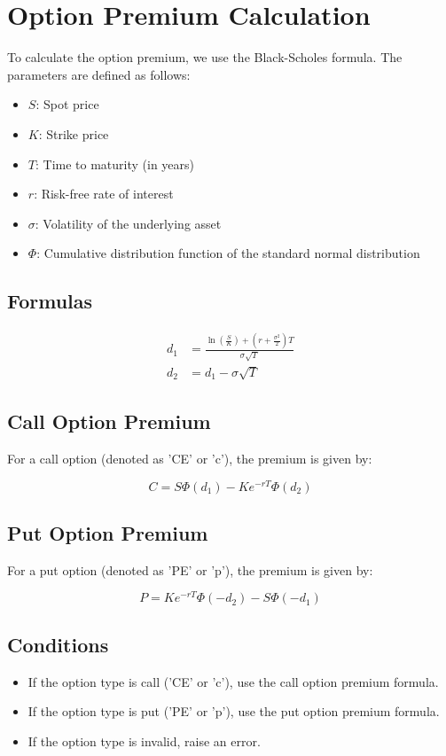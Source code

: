 \documentclass{article}
\begin{document}
\section*{Option Premium Calculation}

To calculate the option premium, we use the Black-Scholes formula. The parameters are defined as follows:

\begin{itemize}
    \item \( S \): Spot price
    \item \( K \): Strike price
    \item \( T \): Time to maturity (in years)
    \item \( r \): Risk-free rate of interest
    \item \( \sigma \): Volatility of the underlying asset
    \item \( \Phi \): Cumulative distribution function of the standard normal distribution
\end{itemize}

\subsection*{Formulas}

\begin{align*}
d_1 & = \frac{\ln\left(\frac{S}{K}\right) + \left(r + \frac{\sigma^2}{2}\right)T}{\sigma \sqrt{T}} \\
d_2 & = d_1 - \sigma \sqrt{T}
\end{align*}

\subsection*{Call Option Premium}

For a call option (denoted as 'CE' or 'c'), the premium is given by:

\[
C = S \Phi(d_1) - K e^{-rT} \Phi(d_2)
\]

\subsection*{Put Option Premium}

For a put option (denoted as 'PE' or 'p'), the premium is given by:

\[
P = K e^{-rT} \Phi(-d_2) - S \Phi(-d_1)
\]

\subsection*{Conditions}

\begin{itemize}
    \item If the option type is call ('CE' or 'c'), use the call option premium formula.
    \item If the option type is put ('PE' or 'p'), use the put option premium formula.
    \item If the option type is invalid, raise an error.
\end{itemize}
\end{document}
